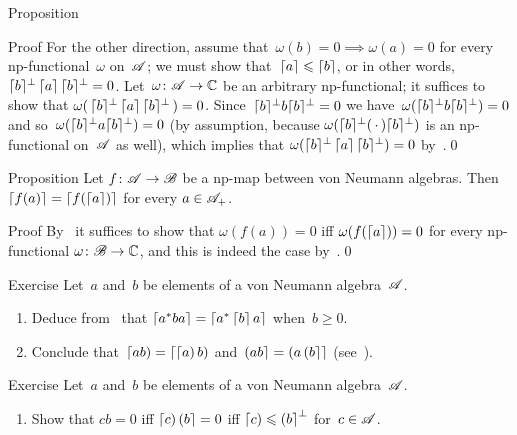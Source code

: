 \documentclass[a]{subfiles}
\begin{document}
\begin{parsec}
\begin{point}{Proposition}
\begin{point}{Proof}
For the other direction,
assume that~$\omega(b)=0\implies \omega(a)=0$
for every np-functional~$\omega$ on~$\mathscr{A}$;
we must show that~$\left\lceil a\right\rceil\leqslant \left\lceil b\right\rceil$,
or in other words, $\smash{\left\lceil b\right\rceil}^\perp \left\lceil a\right\rceil\smash{\left\lceil b\right\rceil}^\perp =0$.
Let~$\omega\colon \mathscr{A}\to\mathbb{C}$ be an arbitrary np-functional;
it suffices to show that 
$\omega(\,\smash{\left\lceil b\right\rceil}^\perp \left\lceil a\right\rceil\smash{\left\lceil b\right\rceil}^\perp \,)=0$.
Since~$\smash{\left\lceil b\right\rceil}^\perp b \smash{\left\lceil b\right\rceil}^\perp =0$
we have~$\omega(\smash{\left\lceil b\right\rceil}^\perp b\smash{\left\lceil b\right\rceil}^\perp)=0$
and so~$\omega(\smash{\left\lceil b\right\rceil}^\perp a \smash{\left\lceil b\right\rceil}^\perp)=0$
(by assumption, because
$\omega(\smash{\left\lceil b\right\rceil}^\perp(\,\cdot\,)\smash{\left\lceil b\right\rceil}^\perp)$
is an np-functional on~$\mathscr{A}$ as well),
which implies that
$\omega(\smash{\left\lceil b\right\rceil}^\perp\left\lceil a\right\rceil\smash{\left\lceil b\right\rceil}^\perp)=0$
by~.\qed
\end{point}
\end{point}
\begin{point}{Proposition}%
Let $f\colon \mathscr{A}\to\mathscr{B}$ be a np-map
between von Neumann algebras.
Then $\left\lceil f(a)\right\rceil=\left\lceil f(\left\lceil a\right\rceil)\right\rceil$
for every $a\in\mathscr{A}_+$.
\begin{point}{Proof}%
By~
it suffices to show that
$\omega(f(a))=0$ iff $\omega(f(\left\lceil a\right\rceil))=0$
for every np-functional $\omega\colon \mathscr{B}\to\mathbb{C}$,
and this is indeed the case by~.\qed
\end{point}
\end{point}
\begin{point}{Exercise}%
Let~$a$ and~$b$ be elements of a von Neumann algebra~$\mathscr{A}$.
\begin{enumerate}
\item
Deduce from~
that
$\left\lceil a^*ba\right\rceil = \left\lceil a^*\left\lceil b\right\rceil a\right\rceil$
when~$b\geq 0$.
\item
Conclude that~$\left\lceil ab\right)=\left\lceil\left\lceil a\right)b\right)$
and~$\left(ab\right\rceil=\left(a\left(b\right\rceil\right\rceil$
(see~).

\end{enumerate}
\end{point}
\begin{point}{Exercise}%
Let~$a$ and~$b$ be elements of a von Neumann algebra~$\mathscr{A}$.
\begin{enumerate}
\item
Show that $cb=0$ iff $\left\lceil c\right)\left(b\right\rceil=0$
iff $\left\lceil c\right)\leqslant \left(b\right\rceil^\perp$
for~$c\in\mathscr{A}$.


\end{enumerate}
\end{point}
\end{parsec}
\end{document}
